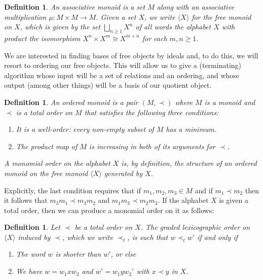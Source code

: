 \documentclass[fleqn, a4paper, twoside]{article}
\newcommand{\0}{\langle 0\rangle}
\newenvironment{tenumerate}{
 \begin{enumerate}
  \setlength{\itemsep}{0pt}
  \setlength{\parskip}{0pt}
}{\end{enumerate}}
\DeclareRobustCommand{\[}{\begin{equation}}%
\DeclareRobustCommand{\]}{\end{equation}}%
\theoremstyle{mytheorem}
\theoremstyle{introthm}
\theoremstyle{mydefinition}
\newtheorem{definition}[theorem]{Definition}
\theoremstyle{mydefinition2}
\theoremstyle{plain} %
\newcommand{\?}{\,?\,}
\theoremstyle{mytheorem}
\theoremstyle{plain} %
\begin{document}
\begin{definition}
An associative monoid is a set $M$ along with
an associative multiplication $\mu : M\times M
\longrightarrow M$. Given a set $X$, we write
$\langle X\rangle$ for the free monoid on 
$X$, which is given by the set
$
 \bigsqcup_{n\geqslant 1} X^{n}
 $
of all \emph{words the alphabet $X$} with
product the isomorphism
$ X^n\times X^m \cong X^{m+n}$
for each $m,n\geqslant 1$.
\end{definition}

We are interested in finding bases of 
free objects by ideals and, to do this,
we will resort to ordering our free objects.
This will allow us to give a (terminating)
algorithm whose input will be a set of 
relations and an ordering, and whose
output (among other things) will 
be a basis of our quotient object.

\begin{definition}

An ordered monoid is a pair $(M,\prec)$ where $M$ is a monoid
and $\prec$ is a total order on $M$ that satisfies the
following three conditions:
\begin{tenumerate}
\item It is a well-order: every non-empty subset of $M$
has a minimum. 
\item The product map of $M$ is increasing in both of its
arguments for $\prec$. 
\end{tenumerate}
A \emph{monomial order} on the alphabet $X$ is, by definition,
the structure of an ordered monoid on the free monoid $\langle X\rangle$
generated by $X$.
\end{definition}

Explicitly, the last condition requires that if $m_1,m_2,m_3\in M$
and if $m_1\prec m_2$ then it follows that $m_3m_1\prec m_3m_2$ 
and $m_1m_3\prec m_2m_3$. If the alphabet $X$ is given a total order, 
then we can produce a monomial order on it as follows:

\begin{definition}
Let $\prec$ be a total order on $X$. 
The graded lexicographic order on $\langle X\rangle$
induced by $\prec$, which we write $\prec_\ell$,
is such that $w\prec_\ell w'$ if and only if
\begin{tenumerate}
\item The word $w$ is shorter than $w'$, or else
\item We have
$w = w_1 xw_2$ and $w' = w_1 y w_2'$ with
$x\prec y$ in $X$.
\end{tenumerate}
\end{definition}
\end{document}
